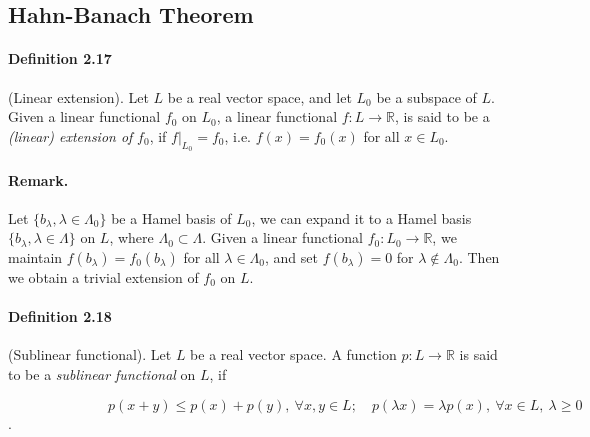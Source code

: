 \documentclass{article}
\begin{document}
\newpage
\subsection{Hahn-Banach Theorem}
\paragraph{Definition 2.17\label{def:2.17}} (Linear extension). Let $L$ be a real vector space, and let $L_0$ be a subspace of $L$. Given a linear functional $f_0$ on $L_0$, a linear functional $f:L\to\mathbb{R}$, is said to be a \textit{(linear) extension of} $f_0$, if $f|_{L_0}=f_0$, i.e. $f(x)=f_0(x)$ for all $x\in L_0$.

\paragraph{Remark.} Let $\{b_\lambda,\lambda\in\Lambda_0\}$ be a Hamel basis of $L_0$, we can expand it to a Hamel basis $\{b_\lambda,\lambda\in\Lambda\}$ on $L$, where $\Lambda_0\subset\Lambda$. Given a linear functional $f_0:L_0\to\mathbb{R}$, we maintain $f(b_\lambda)=f_0(b_\lambda)$ for all $\lambda\in\Lambda_0$, and set $f(b_\lambda)=0$ for $\lambda\notin\Lambda_0$. Then we obtain a trivial extension of $f_0$ on $L$.

\paragraph{Definition 2.18\label{def:2.18}} (Sublinear functional). Let $L$ be a real vector space. A function $p:L\to\mathbb{R}$ is said to be a \textit{sublinear functional} on $L$, if

\vspace{0.30cm}
$\hspace{3cm} p(x+y)\leq p(x)+p(y),\ \forall x,y\in L;\quad p(\lambda x) = \lambda p(x),\ \forall x\in L,\ \lambda\geq 0$.
\vspace{0.10cm}
\end{document}
